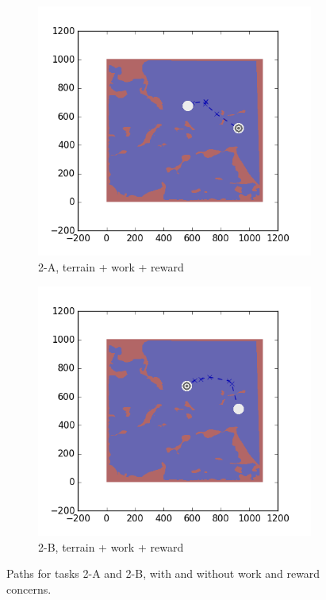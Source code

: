 \documentclass{tamuccthesis}
\begin{document}
\begin{figure}[H]
  \begin{subfigure}[b]{0.35\textwidth}
        \centering
        \includegraphics[width=\textwidth,trim={4cm 3cm 2cm 3cm},clip]{EXP3RG_PathBa_-1_-1_-1_-1.png}
        \caption{{\small2-A, terrain + work + reward}}    
        \label{fig:Path_2-A_terrain_work_reward}
    \end{subfigure}
    \hfill
    \begin{subfigure}[b]{0.35\textwidth}  
        \centering 
        \includegraphics[width=\textwidth,trim={4cm 3cm 2cm 3cm},clip]{EXP3RG_PathBb_-1_-1_-1_-1.png}
        \caption{\small{2-B, terrain + work + reward}}
        \label{fig:Path_2-B_terrain_work_reward}
    \end{subfigure}

    \caption{Paths for tasks 2-A and 2-B, with and without work and reward concerns.}
    \label{fig:Paths_2-A_2-B}
\end{figure}
\end{document}
